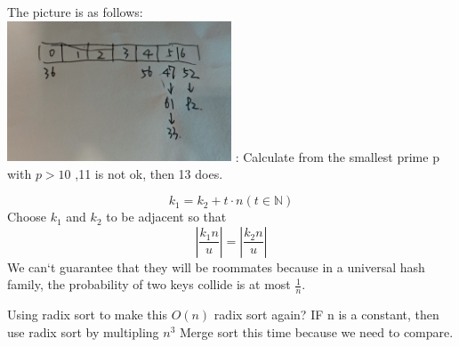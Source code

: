 \documentclass[12pt,twoside]{article}
\begin{document}


\begin{problems}

\problem  %

\begin{problemparts}
\problempart %
The picture is as follows:\\
\includegraphics[width=0.5\textwidth]{1.jpg}
: Calculate from the smallest prime p with $p>10$ ,11 is not ok, then 13 does.
\end{problemparts}


\problem  %

\begin{problemparts}
\problempart %
\[k_1 = k_2 + t\cdot n(t\in \mathbb{N})\]
\problempart %
Choose $k_1$ and $k_2$ to be adjacent so that 
\[|\frac{k_1n}{u}| = |\frac{k_2n}{u}|\]
\problempart %
We can`t  guarantee that they will be roommates because in a universal hash family,
the probability of two keys collide is at most $\frac{1}{n}$.
\end{problemparts}


\problem  %

\begin{problemparts}
\problempart %
Using radix sort to make this $O(n)$
\problempart %
radix sort again?
\problempart %
IF n is a constant, then use radix sort by multipling $n^3$
\problempart %
Merge sort this time because we need to compare.
\end{problemparts}


\end{problems}
\end{document}
